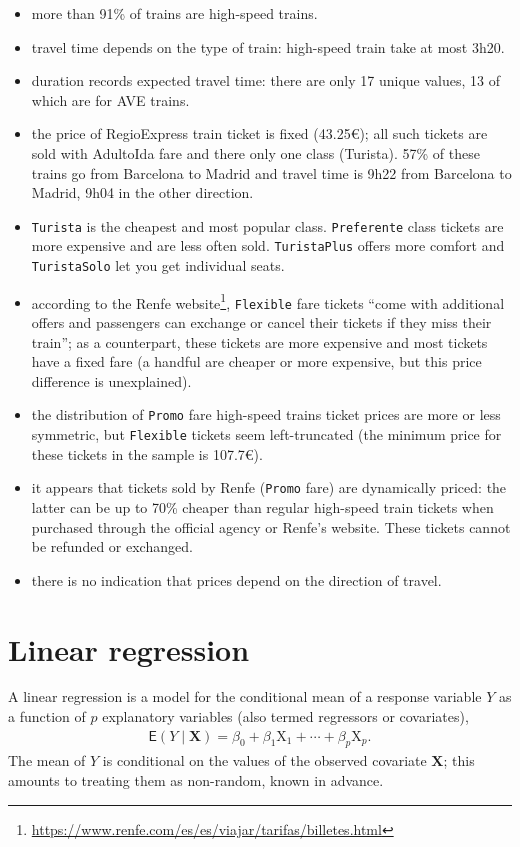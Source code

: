 \documentclass[
  11pt,
  letterpaper,
]{book}
\providecommand{\tightlist}{%
  \setlength{\itemsep}{0pt}\setlength{\parskip}{0pt}}
\renewcommand{\href}[2]{#2\footnote{\url{#1}}}
\theoremstyle{definition}
\theoremstyle{definition}
\theoremstyle{definition}
\theoremstyle{remark}
\begin{document}
\begin{itemize}
\tightlist
\item
  more than 91\% of trains are high-speed trains.
\item
  travel time depends on the type of train: high-speed train take at most 3h20.
\item
  duration records expected travel time: there are only 17 unique values, 13 of which are for AVE trains.
\item
  the price of RegioExpress train ticket is fixed (43.25€); all such tickets are sold with AdultoIda fare and there only one class (Turista). 57\% of these trains go from Barcelona to Madrid and travel time is 9h22 from Barcelona to Madrid, 9h04 in the other direction.
\item
  \texttt{Turista} is the cheapest and most popular class. \texttt{Preferente} class tickets are more expensive and are less often sold. \texttt{TuristaPlus} offers more comfort and \texttt{TuristaSolo} let you get individual seats.
\item
  according to the \href{https://www.renfe.com/es/es/viajar/tarifas/billetes.html}{Renfe website}, \texttt{Flexible} fare tickets ``come with additional offers and passengers can exchange or cancel their tickets if they miss their train''; as a counterpart, these tickets are more expensive and most tickets have a fixed fare (a handful are cheaper or more expensive, but this price difference is unexplained).
\item
  the distribution of \texttt{Promo} fare high-speed trains ticket prices are more or less symmetric, but \texttt{Flexible} tickets seem left-truncated (the minimum price for these tickets in the sample is 107.7€).
\item
  it appears that tickets sold by Renfe (\texttt{Promo} fare) are dynamically priced: the latter can be up to 70\% cheaper than regular high-speed train tickets when purchased through the official agency or Renfe's website. These tickets cannot be refunded or exchanged.
\item
  there is no indication that prices depend on the direction of travel.
\end{itemize}

\hypertarget{linear-regression}{%
\chapter{Linear regression}\label{linear-regression}}

A linear regression is a model for the conditional mean of a response variable \(Y\) as a function of \(p\) explanatory variables (also termed regressors or covariates),
\begin{align}
\mathsf{E}(Y \mid \mathbf{X})=\beta_0 + \beta_1\mathrm{X}_{1} + \cdots + \beta_p \mathrm{X}_{p}. \label{eq:linearreg}
\end{align}
The mean of \(Y\) is conditional on the values of the observed covariate \(\mathbf{X}\); this amounts to treating them as non-random, known in advance.
\end{document}

